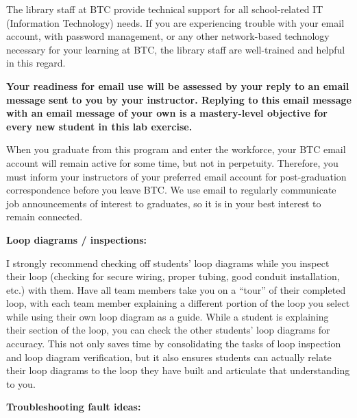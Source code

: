 The library staff at BTC provide technical support for all school-related IT (Information Technology) needs.  If you are experiencing trouble with your email account, with password management, or any other network-based technology necessary for your learning at BTC, the library staff are well-trained and helpful in this regard.

{\bf Your readiness for email use will be assessed by your reply to an email message sent to you by your instructor.  Replying to this email message with an email message of your own is a mastery-level objective for every new student in this lab exercise.}

When you graduate from this program and enter the workforce, your BTC email account will remain active for some time, but not in perpetuity.  Therefore, you must inform your instructors of your preferred email account for post-graduation correspondence before you leave BTC.  We use email to regularly communicate job announcements of interest to graduates, so it is in your best interest to remain connected.

\vskip 10pt
















\noindent
{\bf Loop diagrams / inspections:}

I strongly recommend checking off students' loop diagrams while you inspect their loop (checking for secure wiring, proper tubing, good conduit installation, etc.) with them.  Have all team members take you on a ``tour'' of their completed loop, with each team member explaining a different portion of the loop you select while using their own loop diagram as a guide.  While a student is explaining their section of the loop, you can check the other students' loop diagrams for accuracy.  This not only saves time by consolidating the tasks of loop inspection and loop diagram verification, but it also ensures students can actually relate their loop diagrams to the loop they have built and articulate that understanding to you.

\vskip 10pt

\goodbreak

\noindent
{\bf Troubleshooting fault ideas:}

